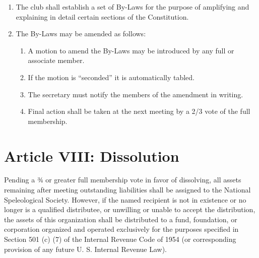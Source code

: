 \documentclass[
]{article}
\providecommand{\tightlist}{%
  \setlength{\itemsep}{0pt}\setlength{\parskip}{0pt}}
\begin{document}
\begin{enumerate}
\def\labelenumi{\arabic{enumi}.}
\tightlist
\item
  The club shall establish a set of By-Laws for the purpose of
  amplifying and explaining in detail certain sections of the
  Constitution.
\item
  The By-Laws may be amended as follows:

  \begin{enumerate}
  \def\labelenumii{\Alph{enumii}.}
  \tightlist
  \item
    A motion to amend the By-Laws may be introduced by any full or
    associate member.
  \item
    If the motion is ``seconded'' it is automatically tabled.
  \item
    The secretary must notify the members of the amendment in writing.
  \item
    Final action shall be taken at the next meeting by a 2/3 vote of the
    full membership.
  \end{enumerate}
\end{enumerate}

\hypertarget{article-viii-dissolution}{%
\section{Article VIII: Dissolution}\label{article-viii-dissolution}}

Pending a ¾ or greater full membership vote in favor of dissolving, all
assets remaining after meeting outstanding liabilities shall be assigned
to the National Speleological Society. However, if the named recipient
is not in existence or no longer is a qualified distributee, or
unwilling or unable to accept the distribution, the assets of this
organization shall be distributed to a fund, foundation, or corporation
organized and operated exclusively for the purposes specified in Section
501 (c) (7) of the Internal Revenue Code of 1954 (or corresponding
provision of any future U. S. Internal Revenue Law).
\end{document}

